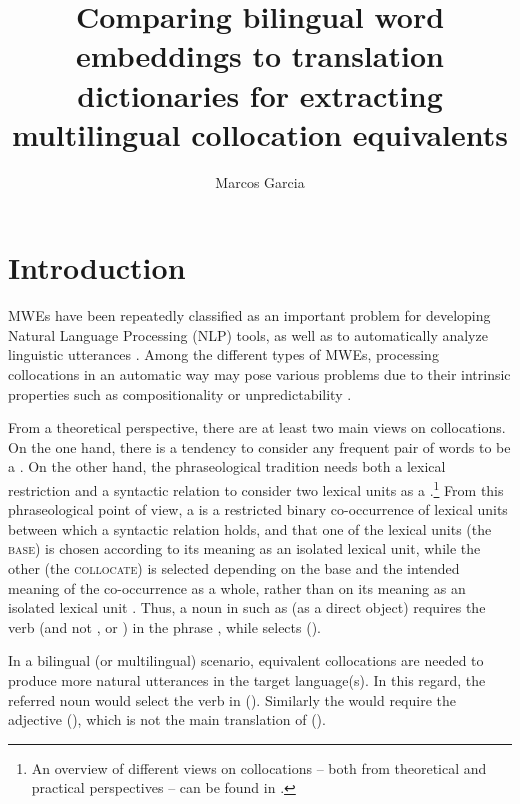 \documentclass[output=paper,modfonts,nonflat]{langsci/langscibook}
\title{Comparing bilingual word embeddings to translation dictionaries for extracting multilingual collocation equivalents}
\author{ Marcos Garcia\affiliation{Universidade da Coruña}}
\begin{document}
\maketitle
\label{GARCIA-CHAPTER}

\section{Introduction}
MWEs have been repeatedly classified as an important problem for developing
Natural Language Processing (NLP) tools, as well as to automatically analyze linguistic
utterances \citep{Sag2002a}. Among the different types of MWEs, processing
collocations in an automatic way may pose various problems due to their intrinsic properties
such as compositionality or unpredictability \citep{melcuk98}.

From a theoretical perspective, there are at least two main views on collocations.
On the one hand, there is a tendency to consider any frequent pair of words to be
a  \citep{smadja1993,evert2003,kilgarriff2006}.
On the other hand, the phraseological tradition needs both a lexical restriction and a syntactic
relation to consider two lexical units as a .\footnote{An overview of different views on collocations
  -- both from theoretical and practical perspectives -- can be found in \citet{seretan2011syntax}.}
From this phraseological point of view, a  is a restricted binary co-occurrence of lexical units
between which a syntactic relation holds, and that one of the lexical units (the \textsc{base})
is chosen according to its meaning as an isolated lexical unit, while the other (the \textsc{collocate})
is selected depending on the base and the intended meaning of the co-occurrence as a whole,
rather than on its meaning as an isolated lexical unit \citep{melcuk98}. Thus, a noun in 
such as  (as a direct object) requires the verb  (and not , or )
in the phrase , while  selects  ().

In a bilingual (or multilingual) scenario, equivalent collocations are needed
to produce more natural utterances in the target language(s). In this regard,
the referred noun  would select the verb  in  (). Similarly the   would require the adjective  (), which is not
the main translation of  ().
\end{document}
